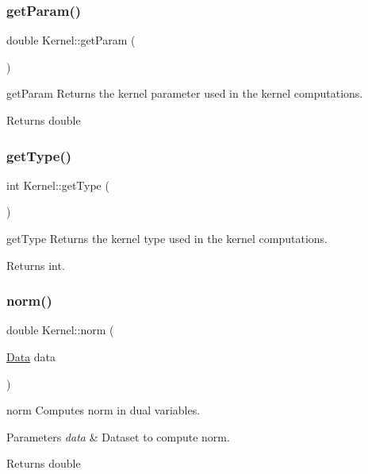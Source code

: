\subsubsection{\texorpdfstring{get\+Param()}{getParam()}}
{\footnotesize\ttfamily double Kernel\+::get\+Param (\begin{DoxyParamCaption}{ }\end{DoxyParamCaption})}



get\+Param Returns the kernel parameter used in the kernel computations. 

\begin{DoxyReturn}{Returns}
double 
\end{DoxyReturn}
\mbox{\label{class_kernel_a5a2cb0fce0eda6c67a2325f6c8958da8}} 
\subsubsection{\texorpdfstring{get\+Type()}{getType()}}
{\footnotesize\ttfamily int Kernel\+::get\+Type (\begin{DoxyParamCaption}{ }\end{DoxyParamCaption})}



get\+Type Returns the kernel type used in the kernel computations. 

\begin{DoxyReturn}{Returns}
int. 
\end{DoxyReturn}
\mbox{\label{class_kernel_a1f548d2e5477ae0ee3dd3bc7f23e6920}} 
\subsubsection{\texorpdfstring{norm()}{norm()}}
{\footnotesize\ttfamily double Kernel\+::norm (\begin{DoxyParamCaption}\item[{\hyperlink{class_data}{Data}}]{data }\end{DoxyParamCaption})}



norm Computes norm in dual variables. 


\begin{DoxyParams}{Parameters}
{\em data} & Dataset to compute norm. \\
\hline
\end{DoxyParams}
\begin{DoxyReturn}{Returns}
double 
\end{DoxyReturn}
\mbox{\label{class_kernel_a3801cee0d86f25f1500d202f43a84b65}} 

